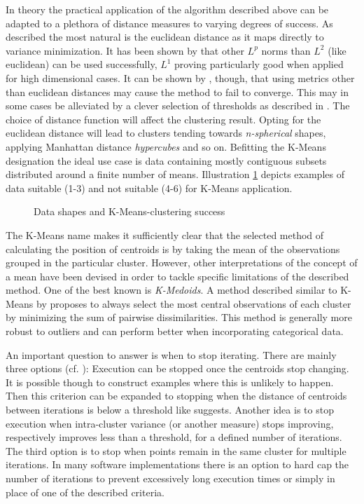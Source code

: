  In theory the practical application of the algorithm described above can be adapted to a plethora of distance measures to varying degrees of success. As described the most natural is the euclidean distance as it maps directly to variance minimization. It has been shown by \cite{aggarwal2001surprising} that other $L^{p}$ norms than $L^{2}$ (like euclidean) can be used successfully, $L^{1}$ proving particularly good when applied for high dimensional cases. It can be shown by \cite{selim1984k}, though, that using metrics other than euclidean distances may cause the method to fail to converge. This may in some cases be alleviated by a clever selection of thresholds as described in .
The choice of distance function will affect the clustering result. Opting for the euclidean distance will lead to clusters tending towards \textit{n-spherical} shapes, applying Manhattan distance \textit{hypercubes} and so on. Befitting the K-Means designation the ideal use case is data containing mostly contiguous subsets distributed around a finite number of means. Illustration \ref{img:k_means_cluster_success} depicts examples of data suitable (1-3) and not suitable (4-6) for K-Means application.

\begin{figure}[h]
\caption{Data shapes and K-Means-clustering success}
\label{img:k_means_cluster_success}
\end{figure}

 The K-Means name makes it sufficiently clear that the selected method of calculating the position of centroids is by taking the mean of the observations grouped in the particular cluster. However, other interpretations of the concept of a mean have been devised in order to tackle specific limitations of the described method. One of the best known is \textit{K-Medoids}. A method described similar to K-Means by \cite{park2009simple} proposes to always select the most central observations of each cluster by minimizing the sum of pairwise dissimilarities. This method is generally more robust to outliers and can perform better when incorporating categorical data.

 An important question to answer is when to stop iterating. There are mainly three options (cf. \cite{cleuziou2008extended}): Execution can be stopped once the centroids stop changing. It is possible though to construct examples where this is unlikely to happen. Then this criterion can be expanded to stopping when the distance of centroids between iterations is below a threshold like \cite{lloyd1982least} suggests. Another idea is to stop execution when intra-cluster variance (or another measure) stops improving, respectively improves less than a threshold, for a defined number of iterations. The third option is to stop when points remain in the same cluster for multiple iterations. In many software implementations there is an option to hard cap the number of iterations to prevent excessively long execution times or simply in place of one of the described criteria.\\

